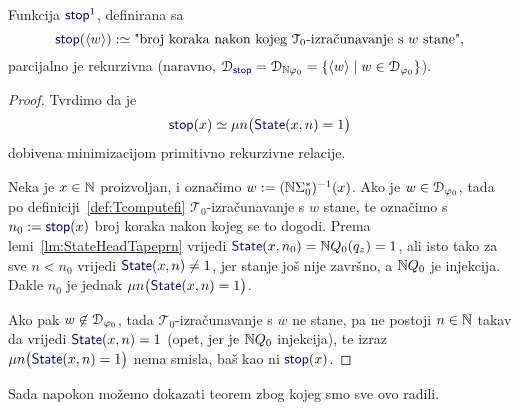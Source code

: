 \begin{lema}\label{lm:stopprek}
Funkcija $\f{stop}^1$, definirana sa
\begin{equation}
    \f{stop}(\kr w):\simeq\text{"broj koraka nakon kojeg $\mathcal T_0$-izračunavanje s $w$ stane",}
\end{equation}
    parcijalno je rekurzivna (naravno, $\dom{\f{stop}}=\dom{\N\varphi_0}=\{\kr w\mid w\in\dom{\varphi_0}\}$).
\end{lema}
\begin{proof}
Tvrdimo da je
\begin{equation}\label{eq:stopdef}
    \f{stop}(x)\simeq\mu n\bigl(\f{State}(x,n)=1\bigr)
\end{equation}
dobivena minimizacijom primitivno rekurzivne relacije.

Neka je $x\in{\mathbb N}$ proizvoljan, i označimo $w:=({\mathbb N}\Sigma_0^*)^{-1}(x)$. Ako je $w\in\mathcal D_{\varphi_0}$, tada po definiciji~\ref{def:Tcomputefi} $\mathcal T_0$-izračunavanje s $w$ stane, te označimo s $n_0:=\f{stop}(x)$ broj koraka nakon kojeg se to dogodi.
Prema lemi~\ref{lm:StateHeadTapeprn} vrijedi $\f{State}(x,n_0)=\N Q_0(q_z)=1$, ali isto tako za sve $n<n_0$ vrijedi $\f{State}(x,n)\not=1$, jer stanje još nije završno, a ${\mathbb N} Q_0$ je injekcija. Dakle $n_0$ je jednak $\mu n\bigl(\f{State}(x,n)=1\bigr)$.

Ako pak $w\not\in\mathcal D_{\varphi_0}$, tada $\mathcal T_0$-izračunavanje s $w$ ne stane, pa ne postoji $n\in{\mathbb N}$ takav da vrijedi $\f{State}(x,n)=1$ (opet, jer je ${\mathbb N} Q_0$ injekcija), te izraz $\mu n\bigl(\f{State}(x,n)=1\bigr)$ nema smisla, baš kao ni $\f{stop}(x)$.
\end{proof}

Sada napokon možemo dokazati teorem zbog kojeg smo sve ovo radili.

